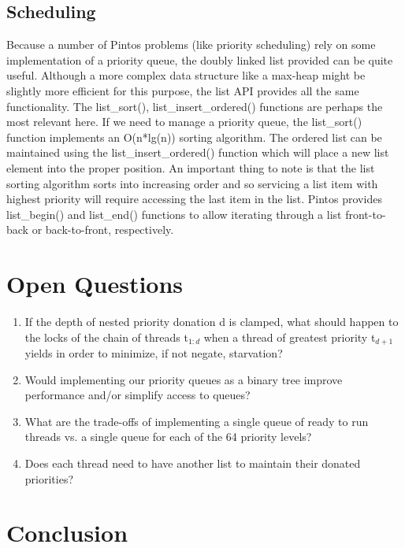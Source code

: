\documentclass[11pt, letterpaper]{article}
\begin{document}
\subsection{Scheduling}

Because a number of Pintos problems (like priority scheduling) rely on some implementation of a priority queue, the doubly linked list provided can be quite useful. Although a more complex data structure like a max-heap might be slightly more efficient for this purpose, the list API provides all the same functionality. The list\_sort(), list\_insert\_ordered() functions are perhaps the most relevant here. If we need to manage a priority queue, the list\_sort() function implements an O(n*lg(n)) sorting algorithm. The ordered list can be maintained using the list\_insert\_ordered() function which will place a new list element into the proper position. An important thing to note is that the list sorting algorithm sorts into increasing order and so servicing a list item with highest priority will require accessing the last item in the list. Pintos provides list\_begin() and list\_end() functions to allow iterating through a list front-to-back or back-to-front, respectively.

\section*{Open Questions}


\begin{enumerate}
\item If the depth of nested priority donation d is clamped, what should happen to the locks of the chain of threads t$_{1:d}$ when a thread of greatest priority t$_{d+1}$ yields in order to minimize, if not negate, starvation?
\item Would implementing our priority queues as a binary tree improve performance and/or simplify access to queues?
\item What are the trade-offs of implementing a single queue of ready to run threads vs. a single queue for each of the 64 priority levels?
\item Does each thread need to have another list to maintain their donated priorities?
\end{enumerate}



\section*{Conclusion}
\end{document}
